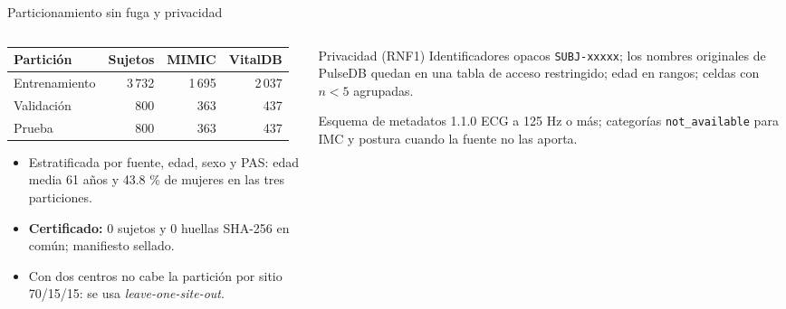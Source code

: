 \documentclass[aspectratio=169]{beamer}
\begin{document}
\begin{frame}{Particionamiento sin fuga y privacidad}
  \begin{columns}[T]
    \begin{column}{0.56\textwidth}
      \small
      \begin{tabular}{lrrr}
        \toprule
        Partición & Sujetos & MIMIC & VitalDB \\
        \midrule
        Entrenamiento & 3\,732 & 1\,695 & 2\,037 \\
        Validación & 800 & 363 & 437 \\
        Prueba & 800 & 363 & 437 \\
        \bottomrule
      \end{tabular}

      \vspace{0.5em}
      \begin{itemize}
        \item Estratificada por fuente, edad, sexo y PAS: edad media 61 años y 43.8 \% de mujeres
              en las tres particiones.
        \item \textbf{Certificado:} 0 sujetos y 0 huellas SHA-256 en común; manifiesto sellado.
        \item Con dos centros no cabe la partición por sitio 70/15/15: se usa
              \textit{leave-one-site-out}.
      \end{itemize}
    \end{column}
    \begin{column}{0.40\textwidth}
      \begin{block}{Privacidad (RNF1)}
        \small
        Identificadores opacos \texttt{SUBJ-xxxxx}; los nombres originales de PulseDB quedan
        en una tabla de acceso restringido; edad en rangos; celdas con $n<5$ agrupadas.
      \end{block}
      \begin{block}{Esquema de metadatos 1.1.0}
        \small
        ECG a 125 Hz o más; categorías \texttt{not\_available} para IMC y postura cuando la
        fuente no las aporta.
      \end{block}
    \end{column}
  \end{columns}
\end{frame}
\end{document}
